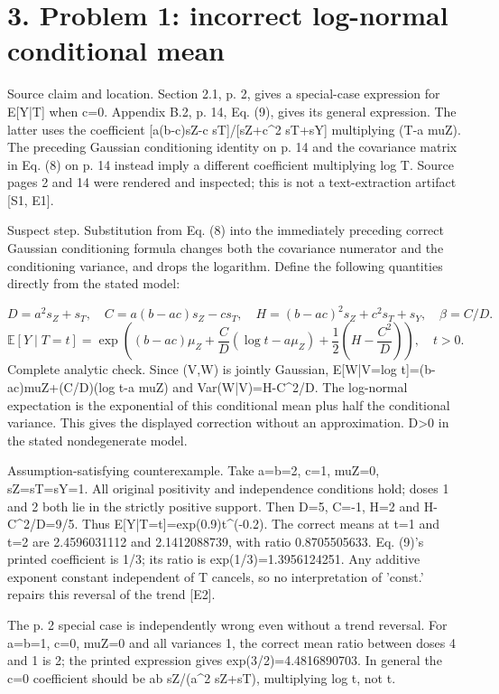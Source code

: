 \documentclass[10pt]{article}
\begin{document}
\section*{3. Problem 1: incorrect log-normal conditional mean}
Source claim and location. Section 2.1, p. 2, gives a special-case expression for E[Y|T] when c=0. Appendix B.2, p. 14, Eq. (9), gives its general expression. The latter uses the coefficient [a(b-c)sZ-c sT]/[sZ+c\textasciicircum{}2 sT+sY] multiplying (T-a muZ). The preceding Gaussian conditioning identity on p. 14 and the covariance matrix in Eq. (8) on p. 14 instead imply a different coefficient multiplying log T. Source pages 2 and 14 were rendered and inspected; this is not a text-extraction artifact [S1, E1].\par
Suspect step. Substitution from Eq. (8) into the immediately preceding correct Gaussian conditioning formula changes both the covariance numerator and the conditioning variance, and drops the logarithm. Define the following quantities directly from the stated model:\par
\[D=a^2s_Z+s_T,\quad C=a(b-ac)s_Z-cs_T,\quad H=(b-ac)^2s_Z+c^2s_T+s_Y,\quad \beta=C/D.\] \[\mathbb E[Y\mid T=t]=\exp\!\left((b-ac)\mu_Z+\frac{C}{D}(\log t-a\mu_Z)+\frac12\left(H-\frac{C^2}{D}\right)\right),\quad t>0.\] Complete analytic check. Since (V,W) is jointly Gaussian, E[W|V=log t]=(b-ac)muZ+(C/D)(log t-a muZ) and Var(W|V)=H-C\textasciicircum{}2/D. The log-normal expectation is the exponential of this conditional mean plus half the conditional variance. This gives the displayed correction without an approximation. D>0 in the stated nondegenerate model.\par
Assumption-satisfying counterexample. Take a=b=2, c=1, muZ=0, sZ=sT=sY=1. All original positivity and independence conditions hold; doses 1 and 2 both lie in the strictly positive support. Then D=5, C=-1, H=2 and H-C\textasciicircum{}2/D=9/5. Thus E[Y|T=t]=exp(0.9)t\textasciicircum{}(-0.2). The correct means at t=1 and t=2 are 2.4596031112 and 2.1412088739, with ratio 0.8705505633. Eq. (9)’s printed coefficient is 1/3; its ratio is exp(1/3)=1.3956124251. Any additive exponent constant independent of T cancels, so no interpretation of ’const.’ repairs this reversal of the trend [E2].\par
The p. 2 special case is independently wrong even without a trend reversal. For a=b=1, c=0, muZ=0 and all variances 1, the correct mean ratio between doses 4 and 1 is 2; the printed expression gives exp(3/2)=4.4816890703. In general the c=0 coefficient should be ab sZ/(a\textasciicircum{}2 sZ+sT), multiplying log t, not t.\par
\end{document}
